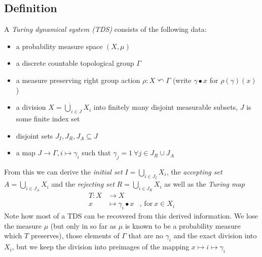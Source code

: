 \subsection{Definition}

\begin{Definition}
	A \emph{Turing dynamical system (TDS)} consists of the following data:
	\begin{itemize}
		\item{a probability measure space $(X,\mu)$}
		\item{a discrete countable topological group $\Gamma$}
		\item{a measure preserving right group action $\rho : X \curvearrowleft \Gamma$ (write $\gamma \bullet x$ for $\rho(\gamma)(x)$)}
		\item{a division $X = \dot\bigcup_{i \in J} X_i$ into finitely many disjoint measurable subsets, $J$ is some finite index set}
		\item{disjoint sets $J_I, J_R, J_A \subseteq J$}
		\item{a map $J \to \Gamma, i \mapsto \gamma_i$ such that $\gamma_j = 1~\forall j \in J_R \cup J_A$}
	\end{itemize}
\end{Definition}
From this we can derive the \emph{initial set} $I = \bigcup_{i\in J_I} X_i$, the \emph{accepting set} $A = \bigcup_{i \in J_A} X_i$ and the \emph{rejecting set} $R = \bigcup_{i \in J_R} X_i$ as well as the \emph{Turing map}
\begin{align*}
	T : X &\to X \\
	x &\mapsto \gamma_i \bullet x&\text{, for}~x \in X_i
\end{align*}
Note how most of a TDS can be recovered from this derived information.
We lose the measure $\mu$ (but only in so far as $\mu$ is known to be a probability measure which $T$ preserves),
those elements of $\Gamma$ that are no $\gamma_i$
and the exact division into $X_i$, but we keep the division into preimages of the mapping $x \mapsto i \mapsto \gamma_i$
